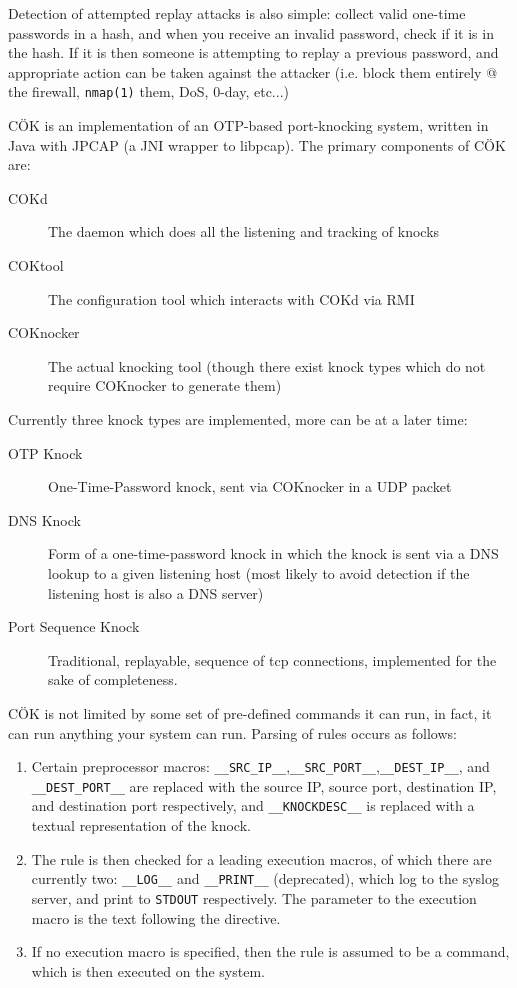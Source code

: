 \documentclass[landscape,twocolumn]{foils}
\begin{document}
Detection of attempted replay attacks is also simple: collect valid one-time passwords in a hash, and when you receive an invalid password, check if it is in the hash.  If it is then someone is attempting to replay a previous password, and appropriate action can be taken against the attacker (i.e. block them entirely @ the firewall, \texttt{nmap(1)} them, DoS, 0-day, etc...)

\small
C\"{O}K is an implementation of an OTP-based port-knocking system, written in Java with JPCAP (a JNI wrapper to libpcap).  The primary components of C\"{O}K are:

\begin{description}
\item[COKd] The daemon which does all the listening and tracking of knocks
\item[COKtool] The configuration tool which interacts with COKd via RMI
\item[COKnocker] The actual knocking tool (though there exist knock types which do not require COKnocker to generate them)
\end{description}

Currently three knock types are implemented, more can be at a later time:
\begin{description}
\item[OTP Knock] One-Time-Password knock, sent via COKnocker in a UDP packet
\item[DNS Knock] Form of a one-time-password knock in which the knock is sent via a DNS lookup to a given listening host (most likely to avoid detection if the listening host is also a DNS server)
\item[Port Sequence Knock] Traditional, replayable, sequence of tcp connections, implemented for the sake of completeness.
\end{description}

\large
{}

\raggedright
\small
C\"{O}K is not limited by some set of pre-defined commands it can run, in fact, it can run anything your system can run.  Parsing of rules occurs as follows:

\begin{enumerate}
\item Certain preprocessor macros: \verb;__SRC_IP__;,\verb;__SRC_PORT__;,\verb;__DEST_IP__;, and \verb;__DEST_PORT__; are replaced with the source IP, source port, destination IP, and destination port respectively, and \verb;__KNOCKDESC__; is replaced with a textual representation of the knock.
\item The rule is then checked for a leading execution macros, of which there are currently two: \verb;__LOG__; and \verb;__PRINT__; (deprecated), which log to the syslog server, and print to \texttt{STDOUT} respectively.  The parameter to the execution macro is the text following the directive.
\item If no execution macro is specified, then the rule is assumed to be a command, which is then executed on the system.
\end{enumerate}
\end{document}
